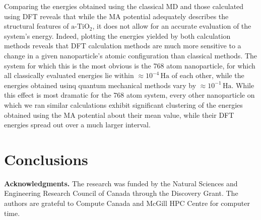 \documentclass[preprint,aps,draft]{revtex4}
\newcommand\tab[1][1cm]{\hspace*{#1}} %
\begin{document}
\tab Comparing the energies obtained using the classical MD and those calculated using DFT reveals that while the MA potential adequately describes the structural features of $\text{a-TiO}_2$, it does not allow for an accurate evaluation of the system's energy.
Indeed, plotting the energies yielded by both calculation methods reveals that DFT calculation methods are much more sensitive to a change in a given nanoparticle's atomic configuration than classical methods.
The system for which this is the most obvious is the 768 atom nanoparticle, for which all classically evaluated energies lie within $\approx 10^{-4}\,\text{Ha}$ of each other, while the energies obtained usinq quantum mechanical methods vary by $\approx 10^{-1}\,\text{Ha}$.
While this effect is most dramatic for the 768 atom system, every other nanoparticle on which we ran similar calculations exhibit significant clustering of the energies obtained using the MA potential about their mean value, while their DFT energies spread out over a much larger interval.

\section*{Conclusions} 



\textbf{Acknowledgments.} The research was funded by the Natural Sciences and Engineering Research Council of Canada through the Discovery Grant. The authors are grateful to Compute Canada and McGill HPC Centre for computer time.


%
%
\end{document}
